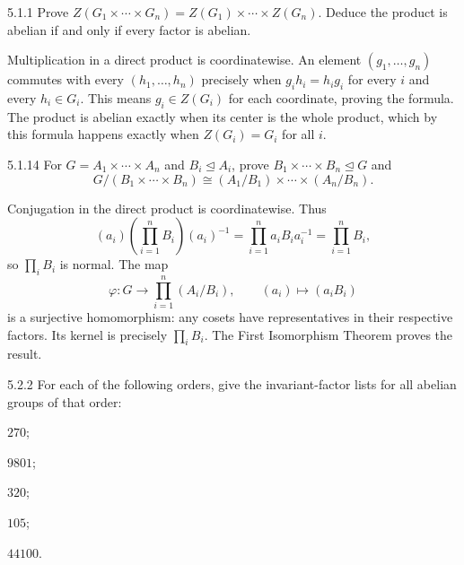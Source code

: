 \documentclass[11pt,oneside]{article}
\begin{document}
\begin{exercise}{5.1.1}
Prove $Z(G_1\times\cdots\times G_n)=Z(G_1)\times\cdots\times Z(G_n)$. Deduce the product is abelian if and only if every factor is abelian.
\end{exercise}

\begin{solution}
Multiplication in a direct product is coordinatewise. An element $(g_1,\ldots,g_n)$ commutes with every $(h_1,\ldots,h_n)$ precisely when $g_ih_i=h_ig_i$ for every $i$ and every $h_i\in G_i$. This means $g_i\in Z(G_i)$ for each coordinate, proving the formula. The product is abelian exactly when its center is the whole product, which by this formula happens exactly when $Z(G_i)=G_i$ for all $i$.
\end{solution}

\begin{exercise}{5.1.14}
For $G=A_1\times\cdots\times A_n$ and $B_i\trianglelefteq A_i$, prove $B_1\times\cdots\times B_n\trianglelefteq G$ and
\[
 G/(B_1\times\cdots\times B_n)\cong(A_1/B_1)\times\cdots\times(A_n/B_n).
\]
\end{exercise}

\begin{solution}
Conjugation in the direct product is coordinatewise. Thus
\[
(a_i)(\prod_{i=1}^n B_i)(a_i)^{-1}=\prod_{i=1}^n a_iB_ia_i^{-1}=\prod_{i=1}^n B_i,
\]
so $\prod_iB_i$ is normal. The map
\[
\varphi:G\to\prod_{i=1}^n(A_i/B_i),\qquad(a_i)\mapsto(a_iB_i)
\]
is a surjective homomorphism: any cosets have representatives in their respective factors. Its kernel is precisely $\prod_iB_i$. The First Isomorphism Theorem proves the result.
\end{solution}

\begin{exercise}{5.2.2}
For each of the following orders, give the invariant-factor lists for all abelian groups of that order:
\begin{exercisesubparts}
\item $270$;
\item $9801$;
\item $320$;
\item $105$;
\item $44100$.
\end{exercisesubparts}
\end{exercise}
\end{document}
